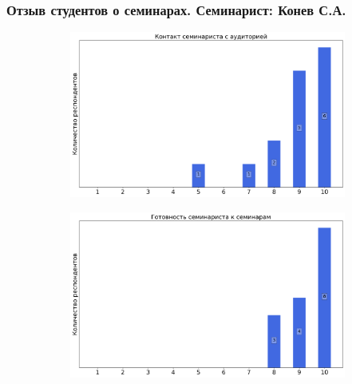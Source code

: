     \subsubsection{Отзыв студентов о семинарах. Семинарист: Конев С.А.}
        \begin{figure}[H]
            \centering
            \begin{subfigure}[b]{0.45\textwidth}
                \centering
                \includegraphics[width=\textwidth]{images/3 course/Вычислительная математика/seminarists-marks-Конев С.А.-0.png}
            \end{subfigure}
            \begin{subfigure}[b]{0.45\textwidth}
                \centering
                \includegraphics[width=\textwidth]{images/3 course/Вычислительная математика/seminarists-marks-Конев С.А.-1.png}
            \end{subfigure}
            \begin{subfigure}[b]{0.45\textwidth}
                \centering

\end{subfigure}
\end{figure}
